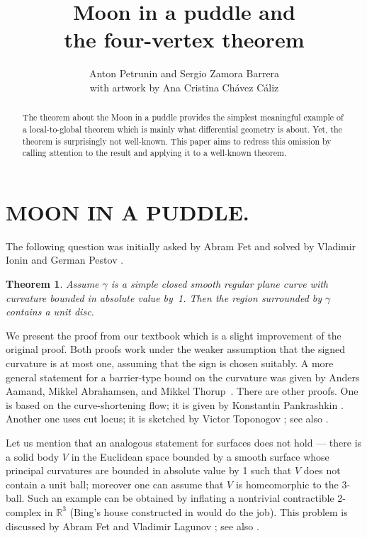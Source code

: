 \documentclass{article}
\theoremstyle{theorem}
\newtheorem{theorem}{Theorem}
\theoremstyle{definition}
\begin{document}
\final
\title{Moon in a puddle and\\ the four-vertex theorem}
\author{Anton Petrunin and Sergio Zamora Barrera\\ with artwork by Ana Cristina Chávez Cáliz}

\maketitle
\BgThispage
\thispagestyle{empty}
\begin{abstract}
The theorem about the Moon in a puddle provides the simplest meaningful example of a local-to-global theorem which is mainly what differential geometry is about.
Yet, the theorem is surprisingly not well-known.
This paper aims to redress this omission by calling attention to the result and applying it to a well-known theorem.
\end{abstract}

\newpage

\section*{\bf MOON IN A PUDDLE.}
The following question was initially asked by Abram Fet and solved by Vladimir Ionin and German Pestov \cite{pestov-ionin}.

\begin{theorem}\label{thm:moon-orginal}
Assume $\gamma$ is a simple closed smooth regular plane curve with curvature bounded in absolute value by~1.
Then the region surrounded by $\gamma$ contains a unit disc.
\end{theorem}

We present the proof from our textbook \cite{petrunin-zamora} which is 
a slight improvement of the original proof.
Both proofs work under the weaker assumption that the signed curvature is at most one, assuming that the sign is chosen suitably.
A more general statement for a barrier-type bound on the curvature was given by Anders Aamand, Mikkel Abrahamsen, and Mikkel Thorup~\cite{aamand-abrahamsen-thoru}.
There are other proofs. 
One is based on the curve-shortening flow; it is given by Konstantin Pankrashkin  \cite{pankrashkin}.
Another one uses cut locus; it is sketched by Victor Toponogov 
\cite[Problem 1.7.19]{toponogov}; see also \cite{petrunin-2020,panov-petrunin}.



Let us mention that an analogous statement for surfaces does not hold --- there is a solid body $V$ in the Euclidean space bounded by a smooth surface whose principal curvatures are bounded in absolute value by 1 such that $V$ does not contain a unit ball; moreover one can assume that $V$ is homeomorphic to the 3-ball.
Such an example can be obtained by inflating a nontrivial contractible 2-complex in $\mathbb{R}^3$ 
(Bing's house constructed in \cite{bing} would do the job).
This problem is discussed by Abram Fet and Vladimir Lagunov \cite{lagunov-2,lagunov-fet}; see also \cite{petrunin-zamora}.
\end{document}
